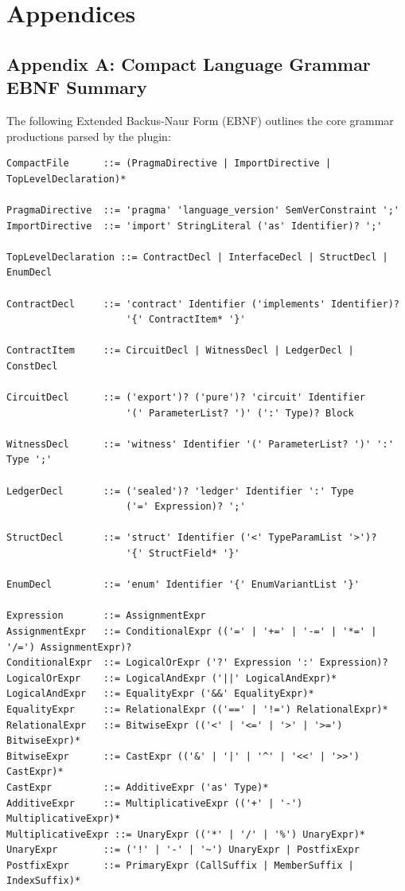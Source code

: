 \section{Appendices}
\label{sec:appendices}

\subsection{Appendix A: Compact Language Grammar EBNF Summary}
\label{sec:appendix_ebnf}

The following Extended Backus-Naur Form (EBNF) outlines the core grammar productions parsed by the plugin:

\begin{verbatim}
CompactFile      ::= (PragmaDirective | ImportDirective | TopLevelDeclaration)*

PragmaDirective  ::= 'pragma' 'language_version' SemVerConstraint ';'
ImportDirective  ::= 'import' StringLiteral ('as' Identifier)? ';'

TopLevelDeclaration ::= ContractDecl | InterfaceDecl | StructDecl | EnumDecl

ContractDecl     ::= 'contract' Identifier ('implements' Identifier)? 
                     '{' ContractItem* '}'

ContractItem     ::= CircuitDecl | WitnessDecl | LedgerDecl | ConstDecl

CircuitDecl      ::= ('export')? ('pure')? 'circuit' Identifier 
                     '(' ParameterList? ')' (':' Type)? Block

WitnessDecl      ::= 'witness' Identifier '(' ParameterList? ')' ':' Type ';'

LedgerDecl       ::= ('sealed')? 'ledger' Identifier ':' Type 
                     ('=' Expression)? ';'

StructDecl       ::= 'struct' Identifier ('<' TypeParamList '>')? 
                     '{' StructField* '}'

EnumDecl         ::= 'enum' Identifier '{' EnumVariantList '}'

Expression       ::= AssignmentExpr
AssignmentExpr   ::= ConditionalExpr (('=' | '+=' | '-=' | '*=' | '/=') AssignmentExpr)?
ConditionalExpr  ::= LogicalOrExpr ('?' Expression ':' Expression)?
LogicalOrExpr    ::= LogicalAndExpr ('||' LogicalAndExpr)*
LogicalAndExpr   ::= EqualityExpr ('&&' EqualityExpr)*
EqualityExpr     ::= RelationalExpr (('==' | '!=') RelationalExpr)*
RelationalExpr   ::= BitwiseExpr (('<' | '<=' | '>' | '>=') BitwiseExpr)*
BitwiseExpr      ::= CastExpr (('&' | '|' | '^' | '<<' | '>>') CastExpr)*
CastExpr         ::= AdditiveExpr ('as' Type)*
AdditiveExpr     ::= MultiplicativeExpr (('+' | '-') MultiplicativeExpr)*
MultiplicativeExpr ::= UnaryExpr (('*' | '/' | '%') UnaryExpr)*
UnaryExpr        ::= ('!' | '-' | '~') UnaryExpr | PostfixExpr
PostfixExpr      ::= PrimaryExpr (CallSuffix | MemberSuffix | IndexSuffix)*
\end{verbatim}

